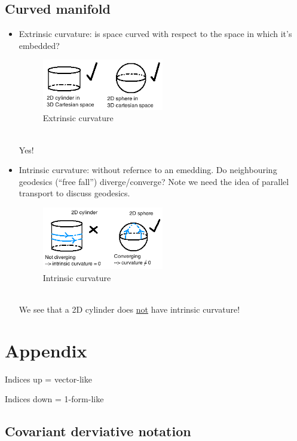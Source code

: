 \documentclass[a4paper]{article} %
\begin{document}
\subsection{Curved manifold}
\begin{itemize}
\item Extrinsic curvature: is space curved with respect to the space in which it's embedded?
\begin{figure}[h]
\centering
\includegraphics[width=0.5\textwidth]{images/extrinsic-curvature.png}
\caption{Extrinsic curvature}
\end{figure}\\
Yes!
\item Intrinsic curvature: without refernce to an emedding. Do neighbouring geodesics (``free fall'') diverge/converge? Note we need the idea of parallel transport to discuss geodesics.
\begin{figure}[h]
\centering
\includegraphics[width=0.5\textwidth]{images/intrinsic-curvature.png}
\caption{Intrinsic curvature}
\end{figure}\\
We see that a 2D cylinder does \underline{not} have intrinsic curvature!
\end{itemize}


\pagebreak

\section{Appendix}


Indices up = vector-like

Indices down = 1-form-like

\subsection{Covariant derviative notation}
\end{document}
